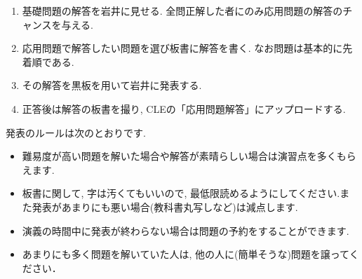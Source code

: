 \documentclass[dvipdfmx,a4paper,11pt]{article}
\theoremstyle{definition}
\begin{document}
\newpage
{}

\begin{enumerate}[label=\textbf{手順}\arabic*.]
  \setlength{\parskip}{0cm} 
  \setlength{\itemsep}{0cm} 
\item 基礎問題の解答を岩井に見せる. 全問正解した者にのみ応用問題の解答のチャンスを与える. 
\item 応用問題で解答したい問題を選び板書に解答を書く. なお問題は基本的に先着順である.
\item その解答を黒板を用いて岩井に発表する. 
\item 正答後は解答の板書を撮り, CLEの「応用問題解答」にアップロードする. 
\end{enumerate}

\hspace{-18pt}発表のルールは次のとおりです.
\begin{itemize}
  \setlength{\parskip}{0cm} 
  \setlength{\itemsep}{0cm} 
\item 難易度が高い問題を解いた場合や解答が素晴らしい場合は演習点を多くもらえます. 
\item 板書に関して, 字は汚くてもいいので, 最低限読めるようにしてください.また発表があまりにも悪い場合(教科書丸写しなど)は減点します.
\item 演義の時間中に発表が終わらない場合は問題の予約をすることができます. 
\item あまりにも多く問題を解いていた人は, 他の人に(簡単そうな)問題を譲ってください．
\end{itemize}
\end{document}
